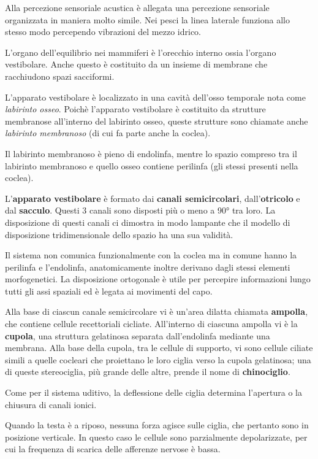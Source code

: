 \documentclass[]{article}
\begin{document}
Alla percezione sensoriale acustica è allegata una percezione sensoriale
organizzata in maniera molto simile. Nei pesci la linea laterale
funziona allo stesso modo percependo vibrazioni del mezzo idrico.

L'organo dell'equilibrio nei mammiferi è l'orecchio interno ossia
l'organo vestibolare. Anche questo è costituito da un insieme di
membrane che racchiudono spazi sacciformi.

L'apparato vestibolare è localizzato in una cavità dell'osso temporale
nota come \emph{labirinto osseo}. Poichè l'apparato vestibolare è
costituito da strutture membranose all'interno del labirinto osseo,
queste strutture sono chiamate anche \emph{labirinto membranoso} (di cui
fa parte anche la coclea).

Il labirinto membranoso è pieno di endolinfa, mentre lo spazio compreso
tra il labirinto membranoso e quello osseo contiene perilinfa (gli
stessi presenti nella coclea).

L'\textbf{apparato vestibolare} è formato dai \textbf{canali
semicircolari}, dall'\textbf{otricolo} e dal \textbf{sacculo}. Questi 3
canali sono disposti più o meno a 90° tra loro. La disposizione di
questi canali ci dimostra in modo lampante che il modello di
disposizione tridimensionale dello spazio ha una sua validità.

Il sistema non comunica funzionalmente con la coclea ma in comune hanno
la perilinfa e l'endolinfa, anatomicamente inoltre derivano dagli stessi
elementi morfogenetici. La disposizione ortogonale è utile per percepire
informazioni lungo tutti gli assi spaziali ed è legata ai movimenti del
capo.

Alla base di ciascun canale semicircolare vi è un'area dilatta chiamata
\textbf{ampolla}, che contiene cellule recettoriali cicliate.
All'interno di ciascuna ampolla vi è la \textbf{cupola}, una struttura
gelatinosa separata dall'endolinfa mediante una membrana. Alla base
della cupola, tra le cellule di supporto, vi sono cellule ciliate simili
a quelle cocleari che proiettano le loro ciglia verso la cupola
gelatinosa; una di queste stereociglia, più grande delle altre, prende
il nome di \textbf{chinociglio}.

Come per il sistema uditivo, la deflessione delle ciglia determina
l'apertura o la chiusura di canali ionici.

Quando la testa è a riposo, nessuna forza agisce sulle ciglia, che
pertanto sono in posizione verticale. In questo caso le cellule sono
parzialmente depolarizzate, per cui la frequenza di scarica delle
afferenze nervose è bassa.
\end{document}

